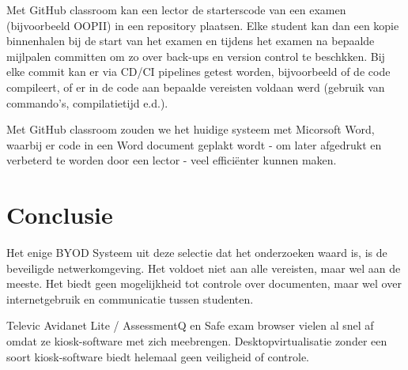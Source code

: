 Met GitHub classroom kan een lector de starterscode van een examen (bijvoorbeeld OOPII) in een repository plaatsen. Elke student kan dan een kopie binnenhalen bij de start van het examen en tijdens het examen na bepaalde mijlpalen committen om zo over back-ups en version control te beschkken. Bij elke commit kan er via CD/CI pipelines getest worden, bijvoorbeeld of de code compileert, of er in de code aan bepaalde vereisten voldaan werd (gebruik van commando's, compilatietijd e.d.). 

Met GitHub classroom zouden we het huidige systeem met Micorsoft Word, waarbij er code in een Word document geplakt wordt - om later afgedrukt en verbeterd te worden door een lector - veel effici\"{e}nter kunnen maken.  
\newpage 

\section{Conclusie}

Het enige BYOD Systeem uit deze selectie dat het onderzoeken waard is, is de beveiligde netwerkomgeving. Het voldoet niet aan alle vereisten, maar wel aan de meeste. Het biedt geen mogelijkheid tot controle over documenten, maar wel over internetgebruik en communicatie tussen studenten.

 Televic Avidanet Lite / AssessmentQ en Safe exam browser vielen al snel af omdat ze kiosk-software met zich meebrengen. Desktopvirtualisatie zonder een soort kiosk-software biedt helemaal geen veiligheid of controle. 


